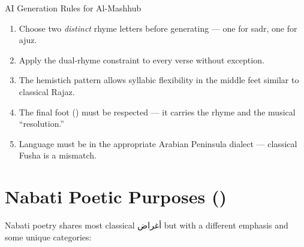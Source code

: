 \begin{rulebox}{AI Generation Rules for Al-Mashhub}
\begin{enumerate}
  \item Choose two \textit{distinct} rhyme letters before generating — one for sadr, one for ajuz.
  \item Apply the dual-rhyme constraint to every verse without exception.
  \item The hemistich pattern  allows syllabic flexibility in the middle feet similar to classical Rajaz.
  \item The final foot () must be respected — it carries the rhyme and the musical ``resolution.''
  \item Language must be in the appropriate Arabian Peninsula dialect — classical Fusha is a mismatch.
\end{enumerate}
\end{rulebox}

\section{Nabati Poetic Purposes ()}
\label{sec:nabati_aghard}

Nabati poetry shares most classical أغراض but with a different emphasis and some unique categories:

